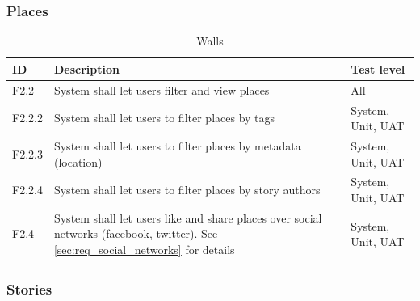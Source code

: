 \documentclass[11pt]{book}
\begin{document}
\subsubsection{Places}

\begin{table}[H]
\centering
\begin{tabular}{ l  p{11cm} l }
    ID       & Description                                                                                              & Test level            \\ \hline
    F2.2     & System shall let users filter and view places                                                            & All                   \\ \hline
    F2.2.2   & System shall let users to filter places by tags                                                          & System, Unit, UAT     \\ \hline
    F2.2.3   & System shall let users to filter places by metadata (location)                                           & System, Unit, UAT     \\ \hline
    F2.2.4   & System shall let users to filter places by story authors                                                 & System, Unit, UAT     \\ \hline
    F2.4     & System shall let users like and share places over social networks (facebook, twitter). 
               See \ref{sec:req_social_networks} for details                                                            & System, Unit, UAT     \\ 
\end{tabular}
\caption{Walls}
\label{tab:req_walls}
\end{table}

\subsubsection{Stories}
\end{document}
